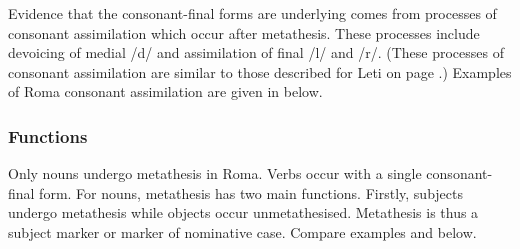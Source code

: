 \begin{exe}
	\label{ex:RomVC->CVMet}
\end{exe}

Evidence that the consonant-final forms are underlying
comes from processes of consonant assimilation which occur after metathesis.
These processes include devoicing of medial /d/ and
assimilation of final /l/ and /r/.
(These processes of consonant assimilation 
are similar to those described for Leti on page .)
Examples of Roma consonant assimilation are given in  below.

\begin{exe}
	\label{ex:RomConAss}
\end{exe}

\subsubsection{Functions}\label{sec:RomFun}
Only nouns undergo metathesis in Roma.
Verbs occur with a single consonant-final form.
For nouns, metathesis has two main functions.
Firstly, subjects undergo metathesis while objects occur unmetathesised.
Metathesis is thus a subject marker or marker of nominative case.
Compare examples  and  below.

